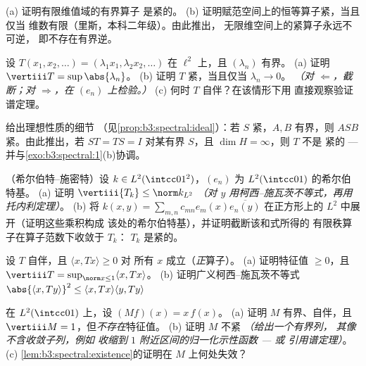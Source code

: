 \begin{exercise}[$\star$]\label{exo:b3:spectral:1}
(a) 证明有限维值域的有界算子
是紧的。
(b) 证明赋范空间上的恒等算子紧，当且仅当
维数有限（里斯，本科二年级）。由此推出，
无限维空间上的紧算子永远不可逆，
即不存在有界逆。
\end{exercise}

\begin{exercise}[$\star$]\label{exo:b3:spectral:2}
设 $T(x_1, x_2, \dots) = (\lambda_1x_1, \lambda_2x_2, \dots)$
在 $\ell^2$ 上，且 $(\lambda_n)$ 有界。
(a) 证明 $\vertiii T = \sup\abs{\lambda_n}$。
(b) 证明 $T$ 紧，当且仅当 $\lambda_n \to 0$。
\emph{（对 $\Leftarrow$，截断；对 $\Rightarrow$，在
$(e_n)$ 上检验。）}
(c) 何时 $T$ 自伴？在该情形下用
直接观察验证谱定理。
\end{exercise}

\begin{exercise}[$\star\star$]\label{exo:b3:spectral:3}
给出理想性质的细节
（见\cref{prop:b3:spectral:ideal}）：若 $S$ 紧，$A, B$
有界，则 $ASB$ 紧。由此推出，若 $ST = TS = I$
对某有界 $S$，且 $\dim H = \infty$，则 $T$ 不是
紧的 --- 并与\cref{exo:b3:spectral:1}(b)协调。
\end{exercise}

\begin{exercise}[$\star\star$]\label{exo:b3:spectral:4}
（希尔伯特–施密特）设 $k \in L^2(\intcc01^2)$，$(e_n)$ 为
$L^2(\intcc01)$ 的希尔伯特基。
(a) 证明 $\vertiii{T_k} \leq \norm k_{L^2}$
\emph{（对 $y$ 用柯西–施瓦茨不等式，再用托内利定理）}。
(b) 将 $k(x,y) = \sum_{m,n}c_{mn}e_m(x)\overline{e_n(y)}$
在正方形上的 $L^2$ 中展开（证明这些乘积构成
该处的希尔伯特基），并证明截断该和式所得的
有限秩算子在算子范数下收敛于 $T_k$：
$T_k$ 是紧的。
\end{exercise}

\begin{exercise}[$\star\star$]\label{exo:b3:spectral:5}
设 $T$ 自伴，且 $\langle x, Tx\rangle \geq 0$ 对
所有 $x$ 成立（\emph{正}算子）。
(a) 证明特征值 $\geq 0$，且 $\vertiii T =
\sup_{\norm x\leq1}\langle x, Tx\rangle$。
(b) 证明广义柯西–施瓦茨不等式
$\abs{\langle x, Ty\rangle}^2 \leq \langle x, Tx\rangle\langle
y, Ty\rangle$
\end{exercise}

\begin{exercise}[$\star\star$]\label{exo:b3:spectral:6}
在 $L^2(\intcc01)$ 上，设 $(Mf)(x) = x\,f(x)$。
(a) 证明 $M$ 有界、自伴，且 $\vertiii M =
1$，但\emph{不存在}特征值。
(b) 证明 $M$ 不紧 \emph{（给出一个有界列，
其像不含收敛子列，例如
收缩到 $1$ 附近区间的归一化示性函数 --- 或
引用谱定理）}。
(c) \cref{lem:b3:spectral:existence}的证明在
$M$ 上何处失效？
\end{exercise}


